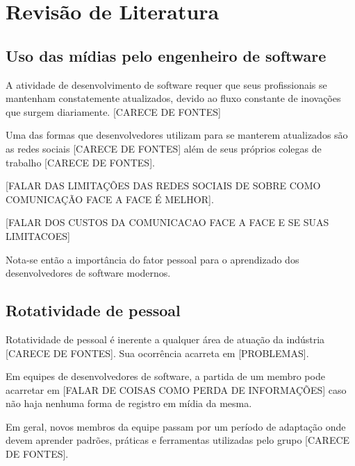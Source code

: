 \chapter{Revisão de Literatura}

\section{Uso das mídias pelo engenheiro de software}

A atividade de desenvolvimento de software requer que seus profissionais se mantenham constatemente atualizados, devido ao fluxo constante de inovações que surgem diariamente. [CARECE DE FONTES]

Uma das formas que desenvolvedores utilizam para se manterem atualizados são as redes sociais [CARECE DE FONTES] além de seus próprios colegas de trabalho [CARECE DE FONTES]. %

[FALAR DAS LIMITAÇÕES DAS REDES SOCIAIS DE SOBRE COMO COMUNICAÇÃO FACE A FACE É MELHOR].

[FALAR DOS CUSTOS DA COMUNICACAO FACE A FACE E SE SUAS LIMITACOES]

Nota-se então a importância do fator pessoal para o aprendizado dos desenvolvedores de software modernos.

\section{Rotatividade de pessoal}

Rotatividade de pessoal é inerente a qualquer área de atuação da indústria [CARECE DE FONTES].
Sua ocorrência acarreta em [PROBLEMAS].

Em equipes de desenvolvedores de software, a partida de um membro pode acarretar em [FALAR DE COISAS COMO PERDA DE INFORMAÇÕES] caso não haja nenhuma forma de registro em mídia da mesma.

Em geral, novos membros da equipe passam por um período de adaptação onde devem aprender padrões, práticas e ferramentas utilizadas pelo grupo [CARECE DE FONTES].


